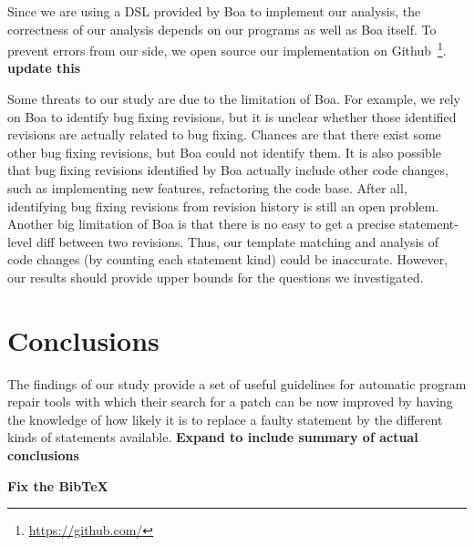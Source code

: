 \documentclass{sig-alternate-05-2015}
\newcommand{\todo}[1]
  {{\scriptsize \textbf{\color{red} {#1}}}}
\begin{document}
Since we are using a DSL provided by Boa to implement our analysis, the
correctness of our analysis depends on our programs as well as Boa itself. To
prevent errors from our side, we open source our implementation on
Github~\footnote{\url{https://github.com/}}.\todo{update
this}

Some threats to our study are due to the limitation of Boa. For example, we rely
on Boa to identify bug fixing revisions, but it is unclear whether those
identified revisions are actually related to bug fixing. Chances are that there
exist some other bug fixing revisions, but Boa could not identify them. It is
also possible that bug fixing revisions identified by Boa actually include other
code changes, such as implementing new features, refactoring the code base.
After all, identifying bug fixing revisions from revision history is still an
open problem. Another big limitation of Boa is that there is no easy to get a
precise statement-level diff between two revisions. Thus, our template matching
and analysis of code changes (by counting each statement kind) could be
inaccurate. However, our results should provide upper bounds for the questions
we investigated. 

\section{Conclusions}
The findings of our study provide a set of useful guidelines for automatic
program repair tools with which their search for a patch can be now improved by
having the knowledge of how likely it is to replace a faulty statement by the
different kinds of statements available.
\todo{Expand to include summary of actual conclusions}




\todo{Fix the BibTeX}


%
%


\end{document}
